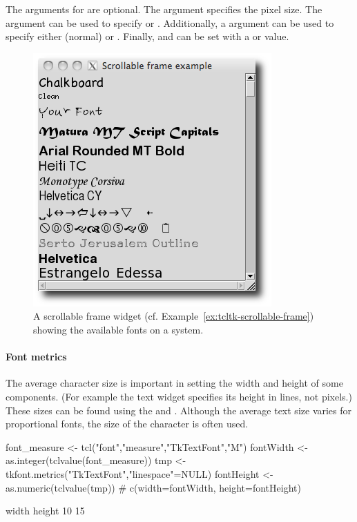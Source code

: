 The arguments for  are optional. The
 argument specifies the pixel size. The
 argument can be used to specify
 or .  Additionally, a
 argument can be used to specify either
 (normal) or . Finally,
 and
 can be set with a  or
 value.


\begin{figure}
  \centering
  \includegraphics[width=.6\textwidth]{fig-tcltk-all-fonts.png}
  \caption{A scrollable frame widget (cf. Example~\ref{ex:tcltk-scrollable-frame}) showing the available fonts on a system.}
  \label{fig:fig-tcltk-all-fonts}
\end{figure}


\paragraph{Font metrics}
The average character size is important in setting the width and
height of some components. (For example the text widget specifies its
height in lines, not pixels.) These sizes can be found using the
 and . Although the
average text size varies for proportional fonts, the size of the
 character is often used.
\begin{Schunk}
\begin{Sinput}
 font_measure <- tcl("font","measure","TkTextFont","M")
 fontWidth <- as.integer(tclvalue(font_measure))
 tmp <- tkfont.metrics("TkTextFont","linespace"=NULL)
 fontHeight <- as.numeric(tclvalue(tmp))
 #
 c(width=fontWidth, height=fontHeight)
\end{Sinput}
\begin{Soutput}
 width height 
    10     15 
\end{Soutput}
\end{Schunk}


